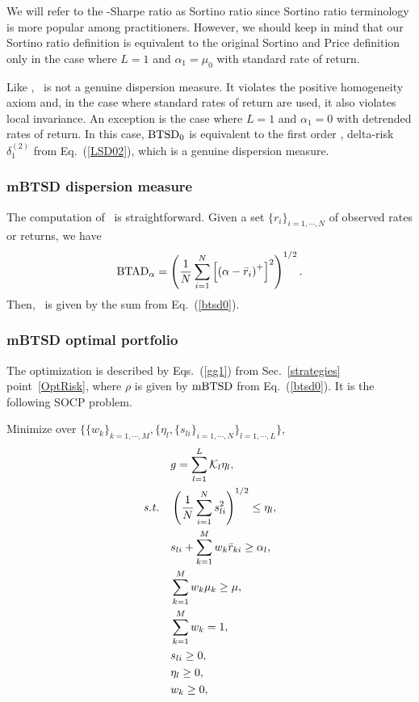 We will refer to the \mBTSD-Sharpe ratio as Sortino ratio since Sortino ratio terminology is more popular among practitioners. However,
we should keep in mind that our Sortino ratio definition is equivalent to the original Sortino and Price \cite{Sortino}
definition only in the case where $L=1$ and $\alpha_1 = \mu_0$ with standard rate of return.

Like \mBTAD, \mBTSD\ is not a genuine dispersion measure. It violates the positive homogeneity axiom and, in the case where standard rates of return
are used, it also violates local invariance. An exception is the case where $L=1$ and $\alpha_1=0$ with detrended rates of return.
In this case, ${\rm BTSD}_0$ is equivalent to the first order \mLSD, delta-risk $\delta^{(2)}_1$ from Eq.~(\ref{LSD02}), which is a genuine dispersion measure.

\BackToContents


\subsubsection{mBTSD dispersion measure}
The computation of \mBTSD\ is straightforward. Given a set $\{r_i\}_{i=1,\cdots,N}$ of observed rates or returns, we have
\begin{equation}
    \BTAD_\alpha = \left( \frac{1}{N}\sum_{i=1}^N \left[ \left(\alpha - \br_i \right)^+ \right]^2 \right)^{1/2}.
    \label{btsd1}
\end{equation}
Then, \mBTSD\ is given by the sum from Eq.~(\ref{btsd0}).

\BackToContents

\subsubsection{mBTSD optimal portfolio}
The optimization is described by Eqs.~(\ref{gg1}) from Sec.~\ref{strategies} point~\ref{OptRisk},
where $\rho$ is given by ${\rm mBTSD}$ from Eq.~(\ref{btsd0}).
It is the following SOCP problem.

\bigskip
\noindent Minimize over $\{\{w_k\}_{k=1,\cdots,M}, \{ \eta_l, \{ s_{li} \}_{i=1,\cdots,N} \}_{l=1,\cdots,L} \}$,
\begin{subequations}\label{btsd2}
\begin{align}
    &g = \sum_{l=1}^L \cK_l \eta_l, \label{btsd2a} \\
    \st &\left( \frac{1}{N} \sum_{i=1}^N s_{li}^2 \right)^{1/2} \leq \eta_l, \label{btsd2b} \\
    & s_{li} + \sum_{k=1}^M w_k \br_{ki} \geq \alpha_l, \label{btsd2c} \\
    & \sum_{k=1}^M w_k \mu_k \geq \mu, \label{btsd2d} \\
    & \sum_{k=1}^M w_k = 1, \label{btsd2e} \\
    & s_{li} \geq 0, \label{btsd2g} \\
    & \eta_l \geq 0, \label{btsdg} \\
    & w_k \geq 0, \label{btsd2f}
\end{align}
\end{subequations}

